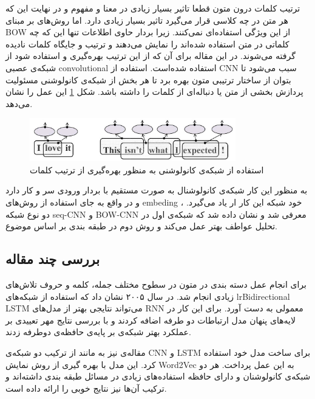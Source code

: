 \documentclass[12pt, a4paper, oneside]{report}
\begin{document}
ترتیب کلمات درون متون قطعا تاثیر بسیار زیادی در معنا و مفهوم و در نهایت این که هر متن در چه کلاسی قرار می‌گیرد
تاثیر بسیار زیادی دارد. اما روش‌های بر مبنای
BOW
از این ویژگی استفاده‌ای نمی‌کنند. زیرا بردار حاوی اطلاعات تنها این که چه کلماتی در متن استفاده شده‌اند را نمایش می‌دهند
و ترتیب و جایگاه کلمات نادیده گرفته می‌شوند. در این مقاله برای آن که از این ترتیب بهره‌گیری و استفاده شود از شبکه‌ی عصبی
convolutional
استفاده شده‌است. استفاده از
CNN
سبب می‌شود تا بتوان از ساختار ترتیبی متون بهره برد تا هر بخش از شبکه‌ی کانولوشنی مسئولیت پردازش بخشی از متن
یا دنباله‌ای از کلمات را داشته باشد. شکل
\ref{fig:cnn-in-text}
این عمل را نشان می‌دهد.

\begin{figure}[h]
    \centering
    \includegraphics[width=0.8\textwidth]{cnn-in-text}
    \caption{ استفاده از شبکه‌ی کانولوشنی به منظور بهره‌گیری از ترتیب کلمات }
    \label{fig:cnn-in-text}
\end{figure}

به منظور این کار شبکه‌ی کانولوشنال به صورت مستقیم با بردار ورودی سر و کار دارد و در واقع به جای استفاده از
روش‌های
embeding
، خود شبکه این کار ار یاد می‌گیرد. دو نوع شبکه
seq-CNN
و
BOW-CNN
معرفی شد و نشان داده شد که شبکه‌ی اول در تحلیل عواطف بهتر عمل می‌کند و روش دوم در طبقه بندی بر اساس موضوع.
\cite{johnson-zhang-2015-effective}

\subsection{بررسی چند مقاله}

برای انجام عمل دسته بندی در متون در سطوح مختلف جمله، کلمه و حروف تلاش‌های زیادی انجام شد.
\cite{graves2005framewise}
در سال ۲۰۰۵ نشان داد که استفاده از شبکه‌های
lr{Bidirectional LSTM}
می‌تواند نتایجی بهتر از مدل‌های
RNN
معمولی به دست آورد. برای این کار در لایه‌های پنهان مدل ارتباطات دو طرفه اضافه کردند و با بررسی نتایج مهر تعییدی
بر عملکرد بهتر شبکه‌ی بر پایه‌ی حافظه‌ی دوطرفه زدند.

مقاله‌ی
\cite{guggilla-etal-2016-cnn}
نیز به مانند 
\cite{wang-etal-2016-combination}
از ترکیب دو شبکه‌ی
CNN
و
LSTM
برای ساخت مدل خود استفاده کرد. این مدل با بهره گیری از روش نمایش
Word2Vec
به این عمل پرداخت. هر دو شبکه‌ی کانولوشنان و دارای حافظه استفاده‌های زیادی در مسائل طبقه بندی داشته‌اند و ترکیب آن‌ها
نیز نتایج خوبی را ارائه داده است.
\end{document}
